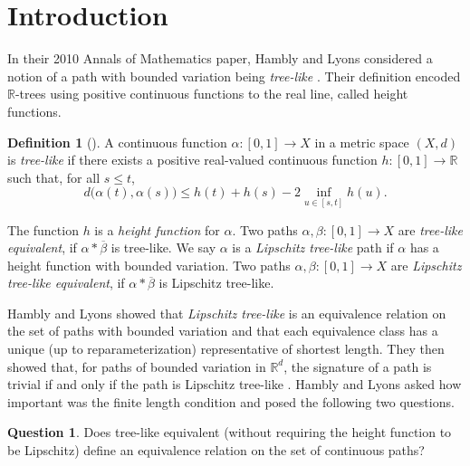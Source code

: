 \documentclass[11pt, leqno]{amsart}
\theoremstyle{definition}\newtheorem{definition}[theorem]{Definition}
\newtheorem{question}[theorem]{Question}
\begin{document}
\section{Introduction}


In their 2010 Annals of Mathematics paper, Hambly and Lyons considered a notion of a path  with bounded variation being \emph{tree-like} \cite{HamblyLyons2010}.  Their definition encoded $\mathbb R$-trees using positive continuous functions to the real line, called height functions.

\begin{definition}[\cite{HamblyLyons2010}]
    A continuous function $\alpha:[0,1]\to X$ in a metric space $(X,d)$ is \emph{tree-like} if there exists a positive real-valued continuous function $h:[0,1]\to\mathbb R$  such that, for all $s\leq t$, \[d\big(\alpha(t), \alpha(s)\big) \leq h(t)+h(s)-2\inf\limits_{u\in[s,t]} h(u).\]

    The function $h$ is a \emph{height function} for $\alpha$. Two paths $\alpha,\beta:[0,1]\to X$ are \emph{tree-like equivalent}, if $\alpha*\overline\beta$ is tree-like.  We say $\alpha$ is a \emph{Lipschitz tree-like} path if $\alpha$ has a height function with bounded variation.  Two paths $\alpha,\beta:[0,1]\to X$ are \emph{Lipschitz tree-like equivalent}, if $\alpha*\overline\beta$ is Lipschitz tree-like.%
\end{definition}

Hambly and Lyons showed that \emph{Lipschitz tree-like} is an equivalence relation on the set of paths with bounded variation and that each equivalence class has a unique (up to reparameterization) representative of shortest length.  They then showed that, for paths of bounded variation in $\mathbb R^d$, the signature of a path is trivial if and only if the path is Lipschitz tree-like \cite[Theorem 4]{HamblyLyons2010}.  Hambly and Lyons asked how important was the finite length condition and posed the following two questions.





\begin{question}\cite[Problem 1.8]{HamblyLyons2010}
    Does tree-like equivalent (without requiring the height function to be Lipschitz) define an equivalence relation on the set of continuous paths?
\end{question}
\end{document}
